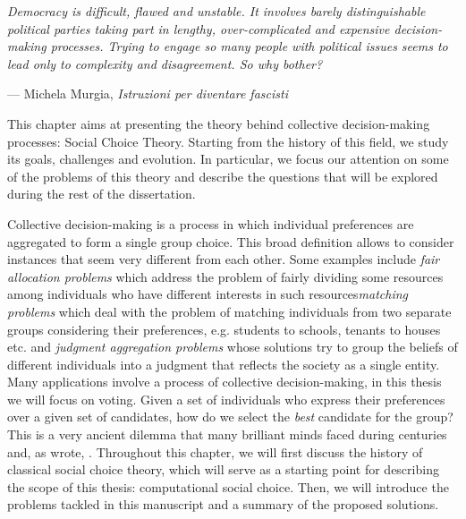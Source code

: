 \setlength{}
\setlength\epigraphrule{0pt}
\renewcommand{\textflush}{flushepinormal}
\epigraph{\itshape Democracy is difficult, flawed and unstable. It involves barely distinguishable political parties taking part in lengthy, over-complicated and expensive decision-making processes. Trying to engage so many people with political issues seems to lead only to complexity and disagreement. So why bother?}{--- Michela Murgia, \textit{Istruzioni per diventare fascisti}}

This chapter aims at presenting the theory behind collective decision-making processes: Social Choice Theory. Starting from the history of this field, we study its goals, challenges and evolution. In particular, we focus our attention on some of the problems of this theory and describe the questions that will be explored during the rest of the dissertation.

Collective decision-making is a process in which individual preferences are aggregated to form a single group choice. This broad definition allows to consider instances that seem very different from each other. Some examples include \textit{fair allocation problems} \textemdash which address the problem of fairly dividing some resources among individuals who have different interests in such resources\textemdash \textit{matching problems} \textemdash which deal with the problem of matching individuals from two separate groups considering their preferences, e.g. students to schools, tenants to houses etc. \textemdash and \textit{judgment aggregation problems} \textemdash whose solutions try to group the beliefs of different individuals into a judgment that reflects the society as a single entity. Many applications involve a process of collective decision-making, in this thesis we will focus on voting. Given a set of individuals who express their preferences over a given set of candidates, how do we select the \textit{best} candidate for the group? This is a very ancient dilemma that many brilliant minds faced during centuries and, as \citet{McLean1990} wrote, . Throughout this chapter, we will first discuss the history of classical social choice theory, which will serve as a starting point for describing the scope of this thesis: computational social choice. Then, we will introduce the problems tackled in this manuscript and a summary of the proposed solutions.

